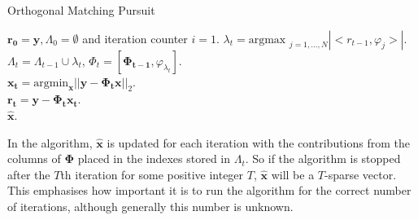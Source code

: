 
\begin{algorithm}
\caption{Orthogonal Matching Pursuit}  
\label{alg:omp}
\begin{algorithmic}

\REQUIRE $\boldsymbol{r_0} = \boldsymbol{y}, \Lambda_0 = \emptyset$ and iteration counter $i = 1$.
 \STATE  $\lambda_t = \text{argmax }_{j=1,\hdots,N}|<r_{t-1}, \varphi_j>|$.\\  
 \STATE  $\Lambda_t = \Lambda_{t-1} \cup {\lambda_t}$, $\Phi_t = [\boldsymbol{\Phi_{t-1}}, \varphi_{\lambda_t}]$.\\ 
\STATE   $\boldsymbol{x_t} = \text{argmin}_{\boldsymbol{x}} || \boldsymbol{y} - \boldsymbol{\Phi_t} \boldsymbol{x}||_2$. \\ 
\STATE  $\boldsymbol{r_t} =  \boldsymbol{y} - \boldsymbol{\Phi_t} \boldsymbol{x_t}$.\\ 
\ENDFOR
\RETURN  $\boldsymbol{\hat{x}}$.

\end{algorithmic}
\end{algorithm}

In the algorithm, $\hat{\boldsymbol{x}}$ is updated for each iteration with the contributions from the columns of $\boldsymbol{\Phi}$ placed in the indexes stored in $\Lambda_t$. So if the algorithm is stopped after the $T$th iteration for some positive integer $T$,  $\boldsymbol{\hat{x}}$ will be a $T$-sparse vector. This emphasises how important it is to run the algorithm for the correct number of iterations, although generally this number is unknown. 

